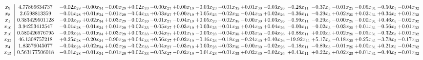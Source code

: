 \documentclass[9pt]{article}
\begin{document}
 \[\begin{array}{c| c c@{\hskip 2pt} c@{\hskip 2pt} c@{\hskip 2pt} c@{\hskip 2pt} c@{\hskip 2pt} c@{\hskip 2pt} c@{\hskip 2pt} c@{\hskip 2pt} c@{\hskip 2pt} c@{\hskip 2pt} c@{\hskip 2pt} c@{\hskip 2pt} c@{\hskip 2pt} c@{\hskip 2pt} c@{\hskip 2pt} c@{\hskip 2pt} }
 x_{9}   &  4.77866634737 & -0.02 x_{28} & -0.00 x_{34} & -0.00 x_{29} & +  0.02 x_{33} & -0.00 x_{27} & +  0.00 x_{19} & -0.03 x_{23} & -0.01 x_{35} & +  0.01 x_{30} & -0.03 x_{26} & -0.28 x_{11} & -0.37 x_{3} & -0.01 x_{25} & -0.06 x_{31} & -0.50 x_{5} & -0.04 x_{32}\\
 x_{8}   &  2.6598813359 & -0.01 x_{28} & +  0.01 x_{34} & -0.01 x_{29} & -0.04 x_{33} & +  0.03 x_{27} & +  0.00 x_{19} & +  0.05 x_{23} & -0.02 x_{35} & -0.04 x_{30} & +  0.02 x_{26} & -0.36 x_{11} & -0.29 x_{3} & +  0.02 x_{25} & +  0.02 x_{31} & +  0.34 x_{5} & +  0.01 x_{32}\\
 x_{1}   &  0.383429501128 & -0.00 x_{28} & +  0.02 x_{34} & +  0.03 x_{29} & -0.00 x_{33} & -0.01 x_{27} & -0.04 x_{19} & +  0.05 x_{23} & -0.02 x_{35} & -0.00 x_{30} & +  0.03 x_{26} & -0.99 x_{11} & -0.29 x_{3} & -0.00 x_{25} & -0.00 x_{31} & +  0.46 x_{5} & -0.02 x_{32}\\
 x_{10}   &  3.94253412547 & -0.01 x_{28} & -0.01 x_{34} & +  0.01 x_{29} & +  0.02 x_{33} & -0.05 x_{27} & +  0.03 x_{19} & +  0.03 x_{23} & +  0.01 x_{35} & +  0.04 x_{30} & +  0.04 x_{26} & -0.00 x_{11} & -0.02 x_{3} & -0.03 x_{25} & +  0.01 x_{31} & -0.56 x_{5} & +  0.01 x_{32}\\
 x_{16}   &  0.580426976795 & -0.06 x_{28} & -0.01 x_{34} & +  0.03 x_{29} & +  0.03 x_{33} & -0.04 x_{27} & +  0.01 x_{19} & -0.03 x_{23} & +  0.04 x_{35} & +  0.03 x_{30} & -0.04 x_{26} & +  0.88 x_{11} & +  0.00 x_{3} & +  0.02 x_{25} & -0.05 x_{31} & -0.32 x_{5} & +  0.01 x_{32}\\
 x_{22}   &  46.1308757218 & +  0.25 x_{28} & -0.20 x_{34} & -0.90 x_{29} & +  0.04 x_{33} & +  0.56 x_{27} & +  0.02 x_{19} & -0.16 x_{23} & -0.18 x_{35} & -0.24 x_{30} & +  0.40 x_{26} & -19.92 x_{11} & +  5.17 x_{3} & -0.18 x_{25} & +  0.25 x_{31} & -3.78 x_{5} & -0.17 x_{32}\\
 x_{4}   &  1.83576045077 & -0.04 x_{28} & +  0.02 x_{34} & +  0.02 x_{29} & -0.02 x_{33} & -0.04 x_{27} & -0.03 x_{19} & +  0.03 x_{23} & +  0.03 x_{35} & -0.00 x_{30} & -0.02 x_{26} & -0.18 x_{11} & -0.89 x_{3} & -0.01 x_{25} & +  0.00 x_{31} & +  0.21 x_{5} & -0.04 x_{32}\\
 x_{15}   &  0.563177506018 & -0.01 x_{28} & -0.01 x_{34} & -0.01 x_{29} & +  0.02 x_{33} & -0.05 x_{27} & -0.02 x_{19} & -0.01 x_{23} & +  0.01 x_{35} & +  0.02 x_{30} & -0.02 x_{26} & +  0.43 x_{11} & +  0.22 x_{3} & +  0.02 x_{25} & +  0.01 x_{31} & -0.40 x_{5} & -0.01 x_{32}\\

\end{array}\]
\end{document}
